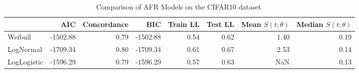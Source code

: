 \begin{table}
\caption{Comparison of AFR Models on the CIFAR10 dataset.}
\label{tab:cifar}
\begin{tabular}{lrrrrrrr}
\toprule
 & AIC & Concordance & BIC & Train LL & Test LL & Mean $S(t;\theta)$ & Median $S(t;\theta)$ \\
\midrule
Weibull & -1502.88 & 0.79 & -1502.88 & 0.54 & 0.62 & 1.40 & 0.19 \\
LogNormal & -1709.34 & 0.80 & -1709.34 & 0.61 & 0.67 & 2.53 & 0.14 \\
LogLogistic & -1596.29 & 0.79 & -1596.29 & 0.57 & 0.63 & NaN & 0.13 \\
\bottomrule
\end{tabular}
\end{table}

